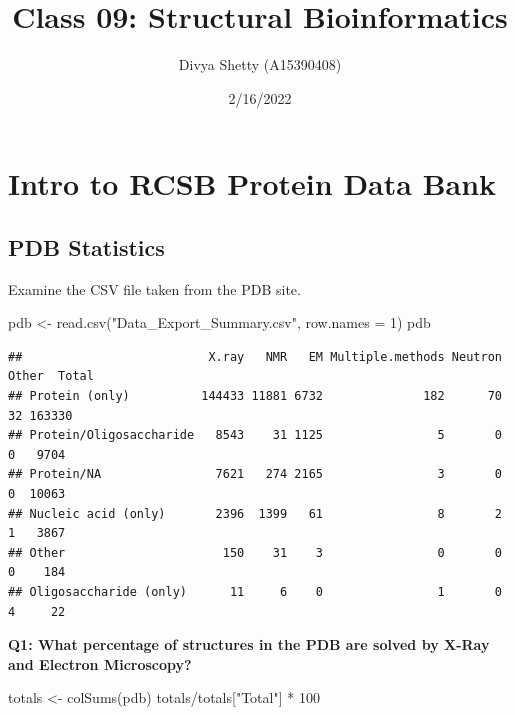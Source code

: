 \documentclass[
]{article}
\title{Class 09: Structural Bioinformatics}
\author{Divya Shetty (A15390408)}
\date{2/16/2022}
\newenvironment{Shaded}{\begin{snugshade}}{\end{snugshade}}
\newcommand{\AttributeTok}[1]{\textcolor[rgb]{0.77,0.63,0.00}{#1}}
\newcommand{\DecValTok}[1]{\textcolor[rgb]{0.00,0.00,0.81}{#1}}
\newcommand{\FunctionTok}[1]{\textcolor[rgb]{0.00,0.00,0.00}{#1}}
\newcommand{\NormalTok}[1]{#1}
\newcommand{\OtherTok}[1]{\textcolor[rgb]{0.56,0.35,0.01}{#1}}
\newcommand{\SpecialCharTok}[1]{\textcolor[rgb]{0.00,0.00,0.00}{#1}}
\newcommand{\StringTok}[1]{\textcolor[rgb]{0.31,0.60,0.02}{#1}}
\begin{document}
\maketitle

\hypertarget{intro-to-rcsb-protein-data-bank}{%
\section{Intro to RCSB Protein Data
Bank}\label{intro-to-rcsb-protein-data-bank}}

\hypertarget{pdb-statistics}{%
\subsection{PDB Statistics}\label{pdb-statistics}}

Examine the CSV file taken from the PDB site.

\begin{Shaded}
\begin{Highlighting}[]
\NormalTok{pdb }\OtherTok{\textless{}{-}} \FunctionTok{read.csv}\NormalTok{(}\StringTok{"Data\_Export\_Summary.csv"}\NormalTok{, }\AttributeTok{row.names =} \DecValTok{1}\NormalTok{)}
\NormalTok{pdb}
\end{Highlighting}
\end{Shaded}

\begin{verbatim}
##                          X.ray   NMR   EM Multiple.methods Neutron Other  Total
## Protein (only)          144433 11881 6732              182      70    32 163330
## Protein/Oligosaccharide   8543    31 1125                5       0     0   9704
## Protein/NA                7621   274 2165                3       0     0  10063
## Nucleic acid (only)       2396  1399   61                8       2     1   3867
## Other                      150    31    3                0       0     0    184
## Oligosaccharide (only)      11     6    0                1       0     4     22
\end{verbatim}

\textbf{Q1: What percentage of structures in the PDB are solved by X-Ray
and Electron Microscopy?}

\begin{Shaded}
\begin{Highlighting}[]
\NormalTok{totals }\OtherTok{\textless{}{-}} \FunctionTok{colSums}\NormalTok{(pdb)}
\NormalTok{totals}\SpecialCharTok{/}\NormalTok{totals[}\StringTok{"Total"}\NormalTok{] }\SpecialCharTok{*} \DecValTok{100}
\end{Highlighting}
\end{Shaded}
\end{document}
